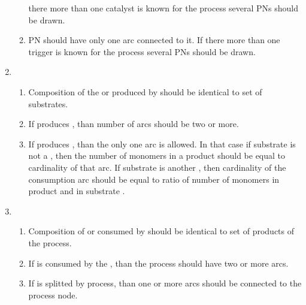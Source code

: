\begin{enumerate}
\begin{enumerate}
    there more than one catalyst is known for the process several PNs should be
    drawn. 
    \item PN should have only one  arc connected to it. If
    there more than one trigger is known for the process several PNs should be
    drawn.  
  \end{enumerate}  
    \item {}
  \begin{enumerate}
    \item Composition of the  or  produced by
     should be identical to set of  substrates.
    \item If  produces , than number of 
     arcs should be two or more.
    \item If  produces , than the only one 
     arc is allowed. In that case if substrate is not a
    , then the number of monomers in a product 
    should be equal to cardinality of that arc. If substrate is another
    , then cardinality of the consumption arc should be equal to
    ratio of number of monomers in product and in substrate .
  \end{enumerate}  
    \item {}
  \begin{enumerate}
    \item Composition of  or  consumed by
     should be identical to set of products of the process.
    \item If  is consumed by the , than the
    process should have two or more  arcs.
    \item If  is splitted by  process, than
    one or more  arcs should be connected to the process node.
  \end{enumerate}  
  
  
\end{enumerate}

